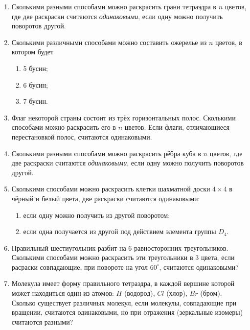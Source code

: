 \begin{enumerate}
    \item Сколькими разными способами можно раскрасить грани тетраэдра в $n$ цветов, где две раскраски считаются \emph{одинаковыми}, если одну можно получить поворотов другой.
    \item Сколькими различными способами можно составить ожерелье из $n$ цветов, в котором будет \begin{enumerate}
        \item 5 бусин;
        \item 6 бусин;
        \item 7 бусин.
    \end{enumerate}

    \item Флаг некоторой страны состоит из трёх горизонтальных полос. Сколькими способами можно раскрасить его в $n$ цветов. Если флаги, отличающиеся перестановкой полос, считаются одинаковыми.

    \item Сколькими разными способами можно раскрасить рёбра куба в $n$ цветов, где две раскраски считаются \emph{одинаковыми}, если одну можно получить поворотов другой.

    \item Сколькими способами можно раскрасить клетки шахматной доски $4 \times 4$ в чёрный и белый цвета, две раскраски считаются одинаковыми: \begin{enumerate}
            \item если одну можно получить из другой поворотом;
            \item если одна получается из другой под действием элемента группы $D_4$.
    \end{enumerate}

    \item Правильный шестиугольник разбит на 6 равносторонних треугольников. Сколькими способами можно раскрасить эти треугольники в 3 цвета, если расраски совпадающие, при повороте на угол $60^\circ$, считаются одинаковыми?

    \item Молекула имеет форму правильного тетраэдра, в каждой вершине которой может находиться один из атомов: $H$ (водород), $Cl$ (хлор), $Br$ (бром). Сколько существует различных молекул, если молекулы, совпадающие при вращении, считаются одинаковыми, но при отражения (зеркальные изомеры) считаются разными?
\end{enumerate}
